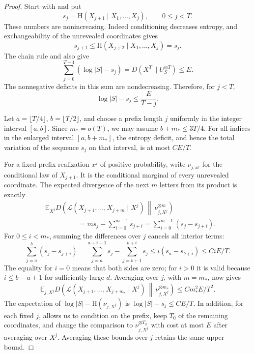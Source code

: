 \begin{proof}
Start with  and put
\[
 s_j=\mathrm H(X_{j+1}\mid X_1,\ldots,X_j),\qquad 0\le j<T.
\]
These numbers are nonincreasing.  Indeed conditioning decreases entropy,
and exchangeability of the unrevealed coordinates gives
\[
 s_{j+1}\le\mathrm H(X_{j+2}\mid X_1,\ldots,X_j)=s_j.
\]
The chain rule and  also give
\begin{equation}
\label{entropy-foundations:deficit-sum}
 \sum_{j=0}^{T-1}(\log|S|-s_j)
   =D(X^T\|U_S^{\otimes T})\le E.
\end{equation}
The nonnegative deficits in this sum are nondecreasing.  Therefore, for
$j<T$,
\[
 \log|S|-s_j\le\frac{E}{T-j}.
\]

Let $a=\lfloor T/4\rfloor$, $b=\lfloor T/2\rfloor$, and choose a prefix
length $j$ uniformly in the integer interval $[a,b]$.  Since $m_*=o(T)$,
we may assume $b+m_*\le3T/4$.  For all indices in the enlarged interval
$[a,b+m_*]$, the entropy deficit, and hence the total variation of the
sequence $s_j$ on that interval, is at most $CE/T$.

For a fixed prefix realization $x^j$ of positive probability, write
$\nu_{j,x^j}$ for the conditional law of $X_{j+1}$.  It is the conditional
marginal of every unrevealed coordinate.  The expected divergence of the
next $m$ letters from its product is exactly
\begin{equation}
\label{entropy-foundations:conditional-block-divergence}
\begin{split}
 &\mathbb E_{X^j}
 D\!\left(\mathcal L(X_{j+1},\ldots,X_{j+m}\mid X^j)
              \,\middle\|\,\nu_{j,X^j}^{\otimes m}\right)\\
 &\hspace{2cm}=m s_j-\sum_{i=0}^{m-1}s_{j+i}
   =\sum_{i=0}^{m-1}(s_j-s_{j+i}).
\end{split}
\end{equation}
For $0\le i<m_*$, summing the differences over $j$ cancels all interior
terms:
\[
 \sum_{j=a}^{b}(s_j-s_{j+i})
   =\sum_{j=a}^{a+i-1}s_j-\sum_{j=b+1}^{b+i}s_j
   \le i(s_a-s_{b+i})\le C iE/T.
\]
The equality for $i=0$ means that both sides are zero; for $i>0$ it is
valid because $i\le b-a+1$ for sufficiently large $d$.  Averaging
 over $j$, with
$m=m_*$, now gives
\begin{equation}
\label{entropy-foundations:averaged-block-divergence}
 \mathbb E_{j,X^j}
 D\!\left(\mathcal L(X_{j+1},\ldots,X_{j+m_*}\mid X^j)
               \,\middle\|\,\nu_{j,X^j}^{\otimes m_*}\right)
       \le C m_*^2E/T^2.
\end{equation}
The expectation of $\log|S|-\mathrm H(\nu_{j,X^j})$ is
$\log|S|-s_j\le CE/T$.  In addition, for each fixed $j$,
 allows us to condition on the prefix,
keep $T_0$ of the remaining coordinates, and change the comparison to
$\nu_{j,X^j}^{\otimes T_0}$ with cost at most $E$ after averaging over
$X^j$. Averaging these bounds over $j$ retains the same upper bound.


\end{proof}
